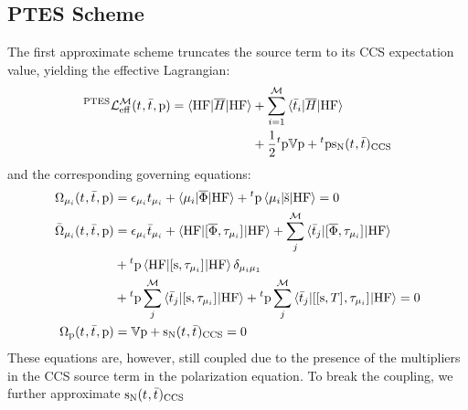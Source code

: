 \subsection*{PTES Scheme}


The first approximate scheme truncates the source term to its \acrshort{CCS}
expectation value, yielding the effective Lagrangian:
\begin{equation}\label{eq:ptes-cc}
  \begin{aligned}
  {}^{\mathrm{PTES}}\mathcal{L}^\mathcal{M}_\mathrm{eff}(t_{}, \bar{t}_{}, \mathrm{p}) =
  \braket{\mathrm{HF} | \overline{H} | \mathrm{HF}}
  &+ \sum_{i=1}^{\mathcal{M}}\braket{\bar{t}_{i} | \overline{H} | \mathrm{HF}} \\
  &+ \frac{1}{2}{}^t\mathrm{p}\mathbb{V}\mathrm{p} + {}^t\mathrm{p}\mathrm{s}_{\mathrm{N}}(t_{},
  \bar{t}_{})_\mathrm{CCS}
  \end{aligned}
\end{equation}
and the corresponding governing equations:
\begin{subequations}
  \begin{align}
   \Omega_{\mu_i}(t_{}, \bar{t}_{}, \mathrm{p})  &=
   \epsilon_{\mu_i}t_{\mu_i} + \braket{\mu_i | \overline{\Phi} | \mathrm{HF}}
   + {}^t\mathrm{p}\braket{\mu_i | \check{\mathrm{s}} | \mathrm{HF}}
             = 0 \\
   \bar{\Omega}_{\mu_i}(t_{}, \bar{t}_{}, \mathrm{p})
    &=
    \epsilon_{\mu_i}\bar{t}_{\mu_i} +
    \braket{\mathrm{HF} | [ \overline{\Phi}, \tau_{\mu_i} ]^{} | \mathrm{HF}} +
    \sum_{j}^{\mathcal{M}}\braket{\bar{t}_{j} |
    [ \overline{\Phi}, \tau_{\mu_i} ]^{} | \mathrm{HF}}
    \nonumber \\
    &+
    {}^t\mathrm{p}\braket{\mathrm{HF} | [ \mathrm{s}, \tau_{\mu_i} ]^{} | \mathrm{HF}}\delta_{\mu_i\mu_1} \nonumber \\
    &+
    {}^t\mathrm{p}\sum_{j}^{\mathcal{M}}\braket{\bar{t}_{j} | [ \mathrm{s}, \tau_{\mu_i} ]^{} | \mathrm{HF}}
    +
    {}^t\mathrm{p}\sum_{j}^{\mathcal{M}}\braket{\bar{t}_{j} | [ [ \mathrm{s}, T ]^{}, \tau_{\mu_i} ]^{} | \mathrm{HF}}
             = 0 \\
    \Omega_{\mathrm{p}}(t_{}, \bar{t}_{}, \mathrm{p})
    &=
    \mathbb{V}\mathrm{p} + \mathrm{s}_{\mathrm{N}}(t_{}, \bar{t}_{})_\mathrm{CCS} = 0
  \end{align}
\end{subequations}
These equations are, however, still coupled due to the presence of the
multipliers in the \acrshort{CCS} source term in the polarization equation.
To break the coupling, we further approximate $\mathrm{s}_{\mathrm{N}}(t_{},\bar{t}_{})_\mathrm{CCS}$
